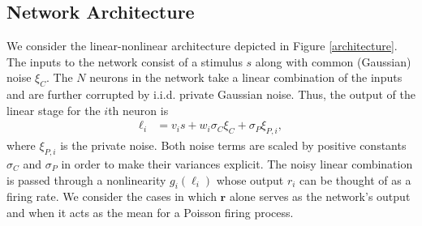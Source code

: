 \documentclass[12pt]{article}
\begin{document}
\subsection{Network Architecture}
We consider the linear-nonlinear architecture depicted in Figure \ref{architecture}. The inputs to the network consist of a stimulus $s$ along with common (Gaussian) noise $\xi_C$. The $N$ neurons in the network take a linear combination of the inputs and are further corrupted by i.i.d. private Gaussian noise. Thus, the output of the linear stage for the $i$th neuron is 
\begin{align}
\ell_i &= v_i s + w_i \sigma_C \xi_C + \sigma_P\xi_{P,i},
\end{align}
where $\xi_{P,i}$ is the private noise. Both noise terms are scaled by positive constants $\sigma_C$ and $\sigma_P$ in order to make their variances explicit. The noisy linear combination is passed through a nonlinearity $g_i(\ell_i)$ whose output $r_i$ can be thought of as a firing rate. We consider the cases in which $\mathbf{r}$ alone serves as the network's output and when it acts as the mean for a Poisson firing process.
\end{document}
